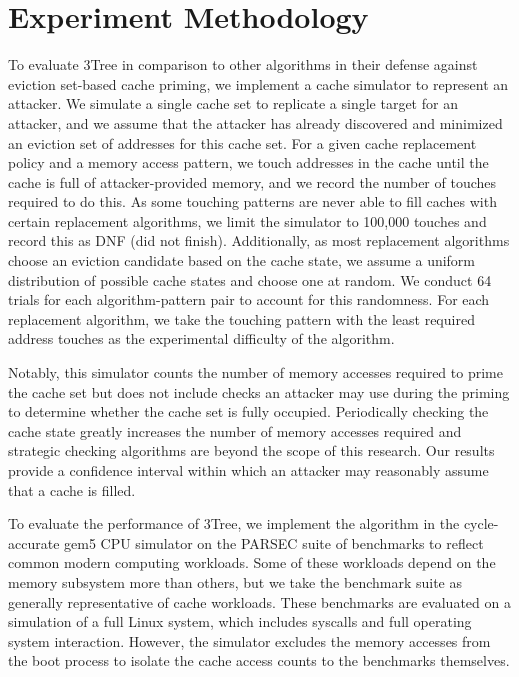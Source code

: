 \documentclass[letterpaper]{article}
\begin{document}
\section{Experiment Methodology}

To evaluate 3Tree in comparison to other algorithms in their defense
against eviction set-based cache priming, %
we implement a cache simulator to represent an attacker.
We simulate a single cache set to replicate a single target for an attacker,
and we assume that the attacker has already discovered and minimized an eviction set
of addresses for this cache set.
For a given cache replacement policy and a memory access pattern,
we touch addresses in the cache until the cache is full of attacker-provided memory,
and we record the number of touches required to do this.
As some touching patterns are never able to fill caches with certain replacement
algorithms, we limit the simulator to 100,000 touches and record this as DNF
(did not finish).
Additionally, as most replacement algorithms choose an eviction candidate
based on the cache state, we assume a uniform distribution of possible cache states
and choose one at random.
We conduct 64 trials for each algorithm-pattern pair to account for this randomness.
For each replacement algorithm, we take the touching pattern with the least
required address touches as the experimental difficulty of the algorithm.

Notably, this simulator counts the number of memory accesses required to prime the cache set
but does not include checks an attacker may use during the priming to determine whether
the cache set is fully occupied.
Periodically checking the cache state greatly increases the number of memory accesses required
and strategic checking algorithms are beyond the scope of this research.
Our results provide a confidence interval within which an attacker may reasonably assume
that a cache is filled.

To evaluate the performance of 3Tree, we implement the algorithm in the
cycle-accurate gem5 CPU simulator on the PARSEC suite of benchmarks \cite{Parsec}
to reflect common modern computing workloads.
Some of these workloads depend on the memory subsystem more than others,
but we take the benchmark suite as generally representative
of cache workloads.
These benchmarks are evaluated on a simulation of a full Linux system,
which includes syscalls and full operating system interaction.
However, the simulator excludes the memory accesses from the boot process
to isolate the cache access counts to the benchmarks themselves.
\end{document}
